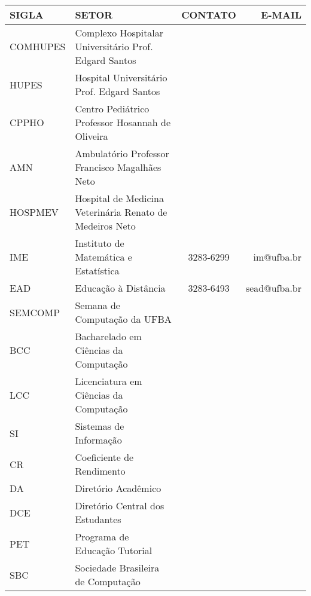 
\begin{table}[h]
\centering
\begin{tabular}{l K{6cm} c r}
\toprule
 SIGLA & SETOR & CONTATO & E-MAIL\\
  \midrule
  COMHUPES & Complexo Hospitalar Universitário Prof. Edgard Santos & & \\
  \midrule
  HUPES & Hospital Universitário Prof. Edgard Santos & & \\
  \midrule
  CPPHO & Centro Pediátrico Professor Hosannah de Oliveira & & \\
  \midrule
  AMN & Ambulatório Professor Francisco Magalhães Neto & & \\
  \midrule
  HOSPMEV & Hospital de Medicina Veterinária Renato de Medeiros Neto & & \\
  \midrule
  IME & Instituto de Matemática e Estatística & 3283-6299 & im@ufba.br \\
  \midrule
  EAD & Educação à Distância & 3283-6493 & sead@ufba.br \\
  \midrule
  SEMCOMP & Semana de Computação da UFBA & & \\
 \midrule
 BCC & Bacharelado em Ciências da Computação \\
 \midrule
 LCC & Licenciatura em Ciências da Computação \\
 \midrule
 SI & Sistemas de Informação \\
 \midrule
 CR & Coeficiente de Rendimento \\
 \midrule
 DA & Diretório Acadêmico \\
 \midrule
 DCE & Diretório Central dos Estudantes \\
 \midrule
 PET & Programa de Educação Tutorial \\
 \midrule
  SBC & Sociedade Brasileira de Computação & & \\
  \bottomrule
\end{tabular}
\end{table}
